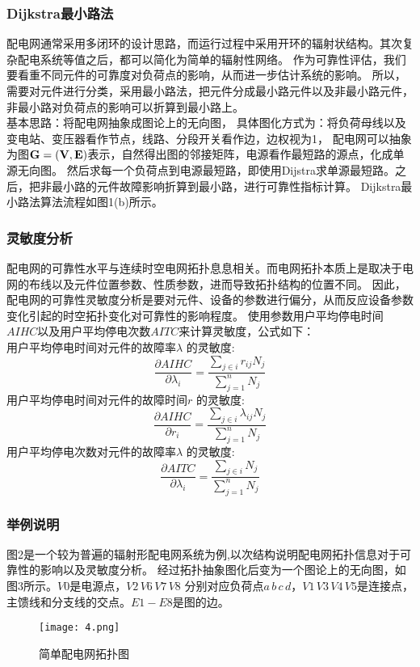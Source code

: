 \documentclass[withoutpreface,bwprint]{cumcmthesis} %
\begin{document}
\subsubsection{Dijkstra最小路法}
配电网通常采用多闭环的设计思路，而运行过程中采用开环的辐射状结构。其次复杂配电系统等值之后，都可以简化为简单的辐射性网络。
作为可靠性评估，我们要看重不同元件的可靠度对负荷点的影响，从而进一步估计系统的影响。
所以，需要对元件进行分类，采用最小路法，把元件分成最小路元件以及非最小路元件，非最小路对负荷点的影响可以折算到最小路上。\\
 \indent   基本思路：将配电网抽象成图论上的无向图，
 具体图化方式为：将负荷母线以及变电站、变压器看作节点，线路、分段开关看作边，边权视为1，
 配电网可以抽象为图$\bf{G} = (V,E)$表示，自然得出图的邻接矩阵，电源看作最短路的源点，化成单源无向图。
 然后求每一个负荷点到电源最短路，即使用Dijstra求单源最短路。之后，把非最小路的元件故障影响折算到最小路，进行可靠性指标计算。
 Dijkstra最小路法算法流程如图1(b)所示。
    
\subsubsection{灵敏度分析}
配电网的可靠性水平与连续时空电网拓扑息息相关。而电网拓扑本质上是取决于电网的布线以及元件位置参数、性质参数，进而导致拓扑结构的位置不同。
因此，配电网的可靠性灵敏度分析是要对元件、设备的参数进行偏分，从而反应设备参数变化引起的时空拓扑变化对可靠性的影响程度。
使用参数\cite{yy4}用户平均停电时间$AIHC$以及用户平均停电次数$AITC$来计算灵敏度，公式如下：\\
\indent 用户平均停电时间对元件的故障率$\lambda$ 的灵敏度:
\begin{equation}
    \frac{\partial AIHC}{\partial \lambda_i} = \frac{\sum_{j\in i}r_{ij} N_j}{\sum_{j=1}^n N_j} 
\end{equation}
\indent 用户平均停电时间对元件的故障时间$r$ 的灵敏度:
\begin{equation}
    \frac{\partial AIHC}{\partial r_i} = \frac{\sum_{j\in i}\lambda_{ij} N_j}{\sum_{j=1}^n N_j} 
\end{equation}
\indent 用户平均停电次数对元件的故障率$\lambda$ 的灵敏度:
\begin{equation}
    \frac{\partial AITC}{\partial \lambda_i} = \frac{\sum_{j\in i} N_j}{\sum_{j=1}^n N_j} 
\end{equation}

\subsubsection{举例说明}
图2是一个较为普遍的辐射形配电网系统为例,以次结构说明配电网拓扑信息对于可靠性的影响以及灵敏度分析。
经过拓扑抽象图化后变为一个图论上的无向图，如图3所示。$V0$是电源点，$V2 \, V6 \, V7 \, V8$
分别对应负荷点$a \, b \, c \, d$，$V1 \, V3 \, V4 \, V5$是连接点，主馈线和分支线的交点。$E1-E8$是图的边。
\begin{figure}[H]
    \centering
    \texttt{[image: 4.png]}
    \caption{简单配电网拓扑图} %
\end{figure}
\end{document}
